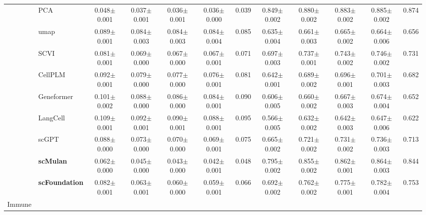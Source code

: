 \begin{table}[htbp]
\begin{tabular}{cl|ccccc|ccccc}
    & PCA      & \cellcolor{gray!25}0.048$\pm$0.001 & \cellcolor{gray!25}0.037$\pm$0.001 & \cellcolor{gray!25}0.036$\pm$0.001 & \cellcolor{gray!25}0.036$\pm$0.000 & \cellcolor{gray!25}0.039      & \cellcolor{gray!25}0.849$\pm$0.002 & \cellcolor{gray!25}0.880$\pm$0.002 & \cellcolor{gray!25}0.883$\pm$0.002 & \cellcolor{gray!25}0.885$\pm$0.002 & \cellcolor{gray!25}0.874 \\
    & umap      & 0.089$\pm$0.001 & 0.084$\pm$0.003 & 0.084$\pm$0.003 & 0.084$\pm$0.004 & 0.085      & 0.635$\pm$0.004 & 0.661$\pm$0.003 & 0.665$\pm$0.002 & 0.664$\pm$0.006 & 0.656 \\
    & SCVI      & 0.081$\pm$0.001 & 0.069$\pm$0.000 & 0.067$\pm$0.000 & 0.067$\pm$0.001 & 0.071      & 0.697$\pm$0.003 & 0.737$\pm$0.001 & 0.743$\pm$0.002 & 0.746$\pm$0.002 & 0.731 \\
    & CellPLM      & 0.092$\pm$0.001 & 0.079$\pm$0.000 & 0.077$\pm$0.000 & 0.076$\pm$0.001 & 0.081      & 0.642$\pm$0.001 & 0.689$\pm$0.002 & 0.696$\pm$0.001 & 0.701$\pm$0.003 & 0.682 \\
    & Geneformer      & 0.101$\pm$0.002 & 0.088$\pm$0.000 & 0.086$\pm$0.000 & 0.084$\pm$0.001 & 0.090      & 0.606$\pm$0.005 & 0.660$\pm$0.002 & 0.667$\pm$0.003 & 0.674$\pm$0.004 & 0.652 \\
    & LangCell      & 0.109$\pm$0.001 & 0.092$\pm$0.001 & 0.090$\pm$0.001 & 0.088$\pm$0.001 & 0.095      & 0.566$\pm$0.005 & 0.632$\pm$0.002 & 0.642$\pm$0.003 & 0.647$\pm$0.006 & 0.622 \\
    & scGPT      & 0.088$\pm$0.000 & 0.073$\pm$0.000 & 0.070$\pm$0.000 & 0.069$\pm$0.001 & 0.075      & 0.665$\pm$0.002 & 0.721$\pm$0.002 & 0.731$\pm$0.002 & 0.736$\pm$0.003 & 0.713 \\
    & \cellcolor{gray!25}\textbf{scMulan}      & 0.062$\pm$0.000 & 0.045$\pm$0.000 & 0.043$\pm$0.000 & 0.042$\pm$0.001 & 0.048      & 0.795$\pm$0.002 & 0.855$\pm$0.002 & 0.862$\pm$0.001 & 0.864$\pm$0.003 & 0.844 \\
    & \cellcolor{gray!25}\textbf{scFoundation}      & 0.082$\pm$0.001 & 0.063$\pm$0.001 & 0.060$\pm$0.000 & 0.059$\pm$0.001 & 0.066      & 0.692$\pm$0.002 & 0.762$\pm$0.002 & 0.775$\pm$0.001 & 0.782$\pm$0.004 & 0.753 \\
    \midrule

    \multirow{9}{*}{Immune}


\end{tabular}
\end{table}
